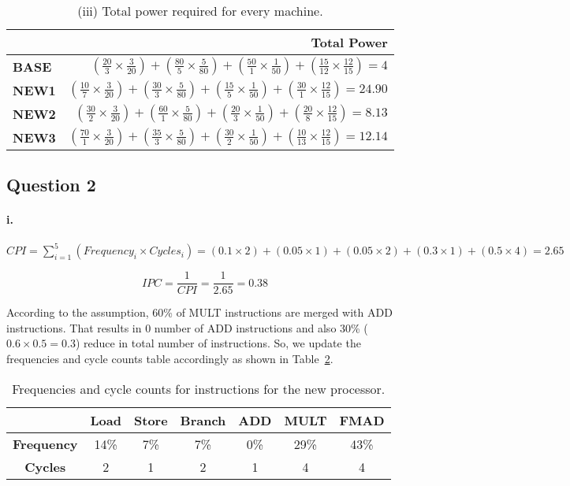 \documentclass[11pt]{article}
\newcommand{\q}[1]{\subsection*{Question {#1}}}
\renewcommand{\part}[1]{\paragraph*{{#1}.}}
\begin{document}
\begin{table}[h]
\center
\begin{tabular}{|l|r|}
	\hline
	 & \textbf{Total Power} \\
	\hline
	\textbf{BASE} & $(\frac{20}{3} \times \frac{3}{20}) + (\frac{80}{5} \times 
	\frac{5}{80}) + (\frac{50}{1} \times \frac{1}{50}) + (\frac{15}{12} \times 
	\frac{12}{15})  = 4$  \\
	\hline
	\textbf{NEW1} & $(\frac{10}{7} \times \frac{3}{20}) + (\frac{30}{3} \times 
	\frac{5}{80}) + (\frac{15}{5} \times \frac{1}{50}) + 
	(\frac{30}{1} \times \frac{12}{15}) = 24.90$ \\
	\hline
	\textbf{NEW2} & $(\frac{30}{2} \times \frac{3}{20}) + (\frac{60}{1} \times 
	\frac{5}{80}) + (\frac{20}{3} \times \frac{1}{50}) + 
	(\frac{20}{8} \times \frac{12}{15}) = 8.13$ \\
	\hline
	\textbf{NEW3} & $(\frac{70}{1} \times \frac{3}{20}) + (\frac{35}{3} \times 
	\frac{5}{80}) + (\frac{30}{2} \times \frac{1}{50}) + 
	(\frac{10}{13} \times \frac{12}{15}) = 12.14$ \\
	\hline
\end{tabular}
\caption{(iii) Total power required for every machine.}
\label{tbl:wpwr}
\end{table}

\q{2}
\part{i} 
$
CPI = \sum \limits_{i=1}^{5} (Frequency_i \times Cycles_i) = 
(0.1 \times 2) + (0.05 \times 1) + (0.05 \times 2) + (0.3 \times 1) + 
(0.5 \times 4) = 2.65
$

$$
IPC = \frac{1}{CPI} = \frac{1}{2.65} = 0.38
$$

According to the assumption, 60\% of MULT instructions are merged with ADD 
instructions. That results in 0 number of ADD instructions and also 30\% 
($0.6 \times 0.5 = 0.3$) reduce in total number of instructions. So, we update 
the frequencies and cycle counts table accordingly as shown in 
Table~\ref{tbl:newfreq}.

\begin{table}[h]
\center
\begin{tabular}{|c|c|c|c|c|c|c|}
	\hline
	 & \textbf{Load} & \textbf{Store} & \textbf{Branch} & \textbf{ADD} & 
	 \textbf{MULT} & \textbf{FMAD} \\
	\hline
	\textbf{Frequency} & 14\% & 7\% & 7\% & 0\% & 29\% & 43\% \\
	\hline
	\textbf{Cycles} & 2 & 1 & 2 & 1 & 4 & 4 \\
	\hline
\end{tabular}
\caption{Frequencies and cycle counts for instructions for the new processor.}
\label{tbl:newfreq}
\end{table}
\end{document}
